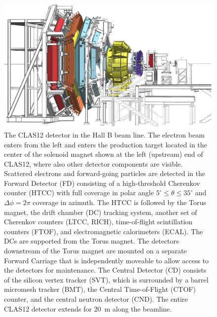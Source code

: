 \documentclass[final,3p,twocolumn]{elsarticle}
\begin{document}
\begin{figure}[t]
\centering
\centerline{\includegraphics[width=1.8\columnwidth]{CLAS12-side-3.png}}
\caption{\footnotesize The CLAS12 detector in the Hall B beam line. 
 The electron 
beam enters from the left and enters the production target located in the center of the solenoid magnet shown at the left (upstream) end of CLAS12, where also other detector components are visible. Scattered electrons and forward-going particles are detected in the Forward Detector (FD) consisting of a high-threshold 
Cherenkov counter (HTCC) with full coverage in polar angle $5^\circ \le \theta \le 35^\circ$ and $\Delta \phi = 2\pi$ coverage in azimuth. The HTCC is followed by the Torus magnet, the drift chamber (DC) tracking system, another set of Cherenkov counters (LTCC, RICH), time-of-flight scintillation counters (FTOF), and electromagnetic calorimeters (ECAL). The DCs are supported from the Torus magnet. The detectors downstream of the Torus magnet are mounted on a separate Forward Carriage that is independently moveable to allow access to the detectors for maintenance. The 
Central Detector (CD) consists of the silicon vertex tracker (SVT), which is surrounded by a barrel micromesh tracker (BMT), the Central Time-of-Flight (CTOF) counter, and the central neutron detector (CND). 
The entire CLAS12 detector extends for 20~m along the beamline.  } 
\label{clas12}
\end{figure}
\end{document}
